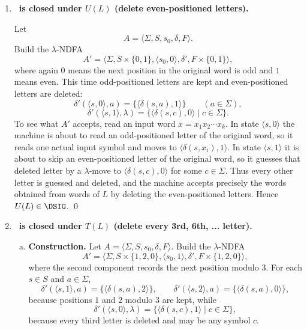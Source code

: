 \begin{enumerate}[{5.}1. ]
\begin{enumerate}[(a)]
  \item \textbf{Proof.}  A computation of $A'$ alternates between deleting one
  symbol of the original word at every odd position and reading one input symbol
  at every even position.  Thus the visible input is exactly the word obtained
  by deleting the odd-positioned letters of some word accepted by $A$.
  Conversely, if a word $z$ arises from deleting the odd-positioned letters of
  some $w\in L$, then $A'$ can guess those deleted odd-positioned letters by
  $\lambda$-moves and read precisely the surviving even-positioned letters.  So
  $L(A')=V(L)$.

  \item $L(A')\in\DSIG$. \qed
\end{enumerate}

\item \textbf{\DSIG\ is closed under $U(L)$ (delete even-positioned letters).}

Let
\[
A=\langle\Sigma,S,s_0,\delta,F\rangle.
\]
Build the $\lambda$-NDFA
\[
A'=\langle\Sigma,S\times\{0,1\},\langle s_0,0\rangle,\delta',F\times\{0,1\}\rangle,
\]
where again $0$ means the next position in the original word is odd and $1$
means even.  This time odd-positioned letters are kept and even-positioned
letters are deleted:
\[
\delta'(\langle s,0\rangle,a)=\{\langle\delta(s,a),1\rangle\}
\qquad (a\in\Sigma),
\]
\[
\delta'(\langle s,1\rangle,\lambda)
=\{\langle\delta(s,c),0\rangle\mid c\in\Sigma\}.
\]
To see what $A'$ accepts, read an input word $x=x_1x_2\cdots x_k$. In state
$\langle s,0\rangle$ the machine is about to read an odd-positioned letter of
the original word, so it reads one actual input symbol and moves to
$\langle\delta(s,x_i),1\rangle$. In state $\langle s,1\rangle$ it is about to
skip an even-positioned letter of the original word, so it guesses that deleted
letter by a $\lambda$-move to $\langle\delta(s,c),0\rangle$ for some $c\in\Sigma$.
Thus every other letter is guessed and deleted, and the machine accepts
precisely the words obtained from words of $L$ by deleting the even-positioned
letters.
Hence $U(L)\in\DSIG$. \qed

\item \textbf{\DSIG\ is closed under $T(L)$ (delete every 3rd, 6th, ... letter).}

\begin{enumerate}[(a)]
  \item \textbf{Construction.}  Let
  $A=\langle\Sigma,S,s_0,\delta,F\rangle$.  Build the $\lambda$-NDFA
  \[
  A'=\langle\Sigma,S\times\{1,2,0\},\langle s_0,1\rangle,\delta',F\times\{1,2,0\}\rangle,
  \]
  where the second component records the next position modulo $3$.  For each
  $s\in S$ and $a\in\Sigma$,
  \[
  \delta'(\langle s,1\rangle,a)=\{\langle\delta(s,a),2\rangle\},
  \qquad
  \delta'(\langle s,2\rangle,a)=\{\langle\delta(s,a),0\rangle\},
  \]
  because positions $1$ and $2$ modulo $3$ are kept, while
  \[
  \delta'(\langle s,0\rangle,\lambda)
  =\{\langle\delta(s,c),1\rangle\mid c\in\Sigma\},
  \]
  because every third letter is deleted and may be any symbol $c$.


\end{enumerate}
\end{enumerate}
